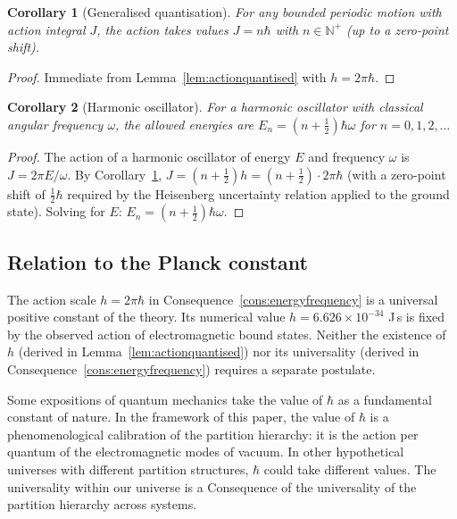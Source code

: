 \documentclass[11pt,twocolumn,a4paper]{article}
\theoremstyle{axiomstyle}
\theoremstyle{conseqstyle}
\newtheorem{corollary}{Corollary}
\theoremstyle{definition}
\theoremstyle{remark}
\newcommand{\Natural}{\mathbb{N}}
\begin{document}
\begin{corollary}[Generalised quantisation]
\label{cor:genquant}
For any bounded periodic motion with action integral $J$, the action takes values $J=n\hbar$ with $n\in\Natural^{+}$ (up to a zero-point shift).
\end{corollary}

\begin{proof}
Immediate from Lemma~\ref{lem:actionquantised} with $h=2\pi\hbar$.
\end{proof}

\begin{corollary}[Harmonic oscillator]
\label{cor:harmonic}
For a harmonic oscillator with classical angular frequency $\omega$, the allowed energies are $E_{n}=(n+\tfrac{1}{2})\hbar\omega$ for $n=0,1,2,\ldots$
\end{corollary}

\begin{proof}
The action of a harmonic oscillator of energy $E$ and frequency $\omega$ is $J=2\pi E/\omega$. By Corollary~\ref{cor:genquant}, $J=(n+\tfrac{1}{2})h=(n+\tfrac{1}{2})\cdot 2\pi\hbar$ (with a zero-point shift of $\tfrac{1}{2}\hbar$ required by the Heisenberg uncertainty relation \citep{heisenberg1927} applied to the ground state). Solving for $E$: $E_{n}=(n+\tfrac{1}{2})\hbar\omega$.
\end{proof}

\subsection{Relation to the Planck constant}

The action scale $h=2\pi\hbar$ in Consequence~\ref{cons:energyfrequency} is a universal positive constant of the theory. Its numerical value $h=6.626\times 10^{-34}$ J\,s is fixed by the observed action of electromagnetic bound states. Neither the existence of $h$ (derived in Lemma~\ref{lem:actionquantised}) nor its universality (derived in Consequence~\ref{cons:energyfrequency}) requires a separate postulate.

Some expositions of quantum mechanics take the value of $\hbar$ as a fundamental constant of nature. In the framework of this paper, the value of $\hbar$ is a phenomenological calibration of the partition hierarchy: it is the action per quantum of the electromagnetic modes of vacuum. In other hypothetical universes with different partition structures, $\hbar$ could take different values. The universality within our universe is a Consequence of the universality of the partition hierarchy across systems.
\end{document}
